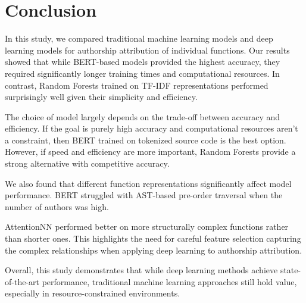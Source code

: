 \documentclass[conference]{IEEEtran}
\begin{document}
\section{Conclusion}

In this study, we compared traditional machine learning models and deep learning models for authorship attribution of individual functions. 
Our results showed that while BERT-based models provided the highest accuracy, they required significantly longer training times and 
computational resources. In contrast, Random Forests trained on TF-IDF representations performed surprisingly well given their simplicity 
and efficiency.

The choice of model largely depends on the trade-off between accuracy and efficiency. If the goal is purely high accuracy and computational 
resources aren’t a constraint, then BERT trained on tokenized source code is the best option. However, if speed and efficiency are more 
important, Random Forests provide a strong alternative with competitive accuracy.

We also found that different function representations significantly affect model performance. BERT struggled with AST-based pre-order 
traversal when the number of authors was high. 

AttentionNN performed better on more structurally complex functions rather than shorter ones. This highlights the need for 
careful feature selection capturing the complex relationships when applying deep learning to authorship attribution.

Overall, this study demonstrates that while deep learning methods achieve state-of-the-art performance, traditional 
machine learning approaches still hold value, especially in resource-constrained environments.
\end{document}

